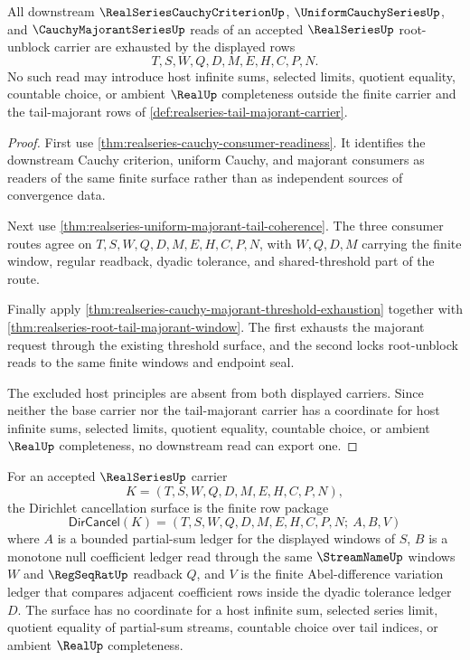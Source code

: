 \begin{theorem}
\label{thm:realseries-root-tail-threshold-exhaustion}
All downstream $\RealSeriesCauchyCriterionUp$, $\UniformCauchySeriesUp$, and $\CauchyMajorantSeriesUp$ reads of an accepted $\RealSeriesUp$ root-unblock carrier are exhausted by the displayed rows
$$
T,S,W,Q,D,M,E,H,C,P,N.
$$
No such read may introduce host infinite sums, selected limits, quotient equality, countable choice, or ambient $\RealUp$ completeness outside the finite carrier and the tail-majorant rows of \autoref{def:realseries-tail-majorant-carrier}.
\end{theorem}
\begin{proof}
First use \autoref{thm:realseries-cauchy-consumer-readiness}. It identifies the downstream Cauchy criterion, uniform Cauchy, and majorant consumers as readers of the same finite surface rather than as independent sources of convergence data.

Next use \autoref{thm:realseries-uniform-majorant-tail-coherence}. The three consumer routes agree on $T,S,W,Q,D,M,E,H,C,P,N$, with $W,Q,D,M$ carrying the finite window, regular readback, dyadic tolerance, and shared-threshold part of the route.

Finally apply \autoref{thm:realseries-cauchy-majorant-threshold-exhaustion} together with \autoref{thm:realseries-root-tail-majorant-window}. The first exhausts the majorant request through the existing threshold surface, and the second locks root-unblock reads to the same finite windows and endpoint seal.

The excluded host principles are absent from both displayed carriers. Since neither the base carrier nor the tail-majorant carrier has a coordinate for host infinite sums, selected limits, quotient equality, countable choice, or ambient $\RealUp$ completeness, no downstream read can export one.
\end{proof}

\begin{definition}
\label{def:realseries-dirichlet-cancellation-surface}
For an accepted $\RealSeriesUp$ carrier
$$
K=(T,S,W,Q,D,M,E,H,C,P,N),
$$
the Dirichlet cancellation surface is the finite row package
$$
\mathsf{DirCancel}(K)=(T,S,W,Q,D,M,E,H,C,P,N;\ A,B,V)
$$
where $A$ is a bounded partial-sum ledger for the displayed windows of $S$, $B$ is a monotone null coefficient ledger read through the same $\StreamNameUp$ windows $W$ and $\RegSeqRatUp$ readback $Q$, and $V$ is the finite Abel-difference variation ledger that compares adjacent coefficient rows inside the dyadic tolerance ledger $D$. The surface has no coordinate for a host infinite sum, selected series limit, quotient equality of partial-sum streams, countable choice over tail indices, or ambient $\RealUp$ completeness.
\end{definition}

